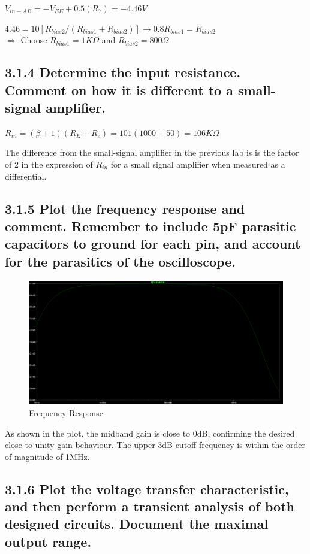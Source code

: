 \documentclass[12pt]{article}
\begin{document}
$V_{in-AB} = -V_{EE} + 0.5(R_7) = -4.46 V$ 

$4.46 = 10 [ R_{bias2} / (R_{bias1} + R_{bias2}) ] \rightarrow 0.8 R_{bias1} = R_{bias2}$ \\

$\Rightarrow$ Choose $R_{bias1} = 1K \Omega$ and $R_{bias2} = 800 \Omega$

\subsection*{3.1.4 Determine the input resistance. Comment on how it is different to a small-signal amplifier.}


$R_{in} = (\beta + 1)(R_E+ R_e) = 101(1000+50) = 106K \Omega$

The difference from the small-signal amplifier in the previous lab is is the factor of 2 in the expression of $R_{in}$ for a small signal amplifier when measured as a differential.

\subsection*{3.1.5 Plot the frequency response and comment. Remember to include 5pF parasitic capacitors to ground for each pin, and account for the parasitics of the oscilloscope.}

\begin{figure}[H]
\centering
\includegraphics[width=1.0\textwidth]{315.PNG}
\caption{Frequency Response}
\end{figure}

As shown in the plot, the midband gain is close to 0dB, confirming the desired close to unity gain behaviour. The upper 3dB cutoff frequency is within the order of magnitude of 1MHz.


\subsection*{3.1.6 Plot the voltage transfer characteristic, and then perform a transient analysis of both designed circuits. Document the maximal output range.}
\end{document}
